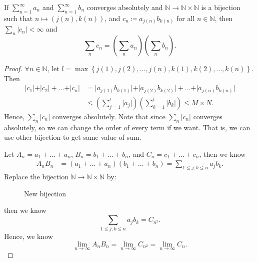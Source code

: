 \begin{theorem}
    If \(\sum_{n=1}^{\infty}  a_n \) and \(\sum_{n=1}^{\infty}  b_n \) converges absolutely and \(\mathbb{N} \to \mathbb{N} \times \mathbb{N} \) is a bijection such that \(n \mapsto \left( j(n), k(n) \right) \), and \(c_n \coloneqq a_{j(n)} b_{k(n)}\) for all \(n \in \mathbb{N} \), then \(\sum_{n} \vert c_n \vert < \infty \) and 
    \[
        \sum_{n} c_n = \left( \sum_{n} a_n  \right) \left( \sum_{n} b_n  \right).   
    \]      
\end{theorem}
\begin{proof}
    \(\forall n \in \mathbb{N} \), let \(l = \max \left\{ j(1), j(2), \dots , j(n), k(1), k(2), \dots , k(n)\right\} \). Then
    \begin{align*}
                \vert c_1 \vert + \vert c_2 \vert + \dots + \vert c_n \vert &= \vert a_{j(1)} b_{k(1)} \vert + \vert a_{j(2)} b_{k(2)} \vert + \dots + \vert a_{j(n)} b_{k(n)} \vert \\ &\le \left( \sum_{j=1}^l \vert a_j \vert   \right) \left( \sum_{k=1}^l \vert b_k \vert \right) \le M \times N. 
    \end{align*}
    Hence, \(\sum_{n} \vert c_n \vert\) converges absolutely. Note that since \(\sum_{n} \vert c_n \vert\) converges absolutely, so we can change the order of every term if we want. That is, we can use other bijection to get same value of sum.
    
    Let \(A_n = a_1 + \dots + a_n\), \(B_n = b_1 + \dots + b_n\), and \(C_n = c_1 + \dots + c_n\), then we know 
    \begin{align*}
        A_n B_n &= \left( a_1 + \dots + a_n \right) \left( b_1 + \dots + b_n \right) = \sum_{1 \le j,k \le n} a_j b_k.  
    \end{align*} 
    Replace the bijection \(\mathbb{N} \to \mathbb{N} \times \mathbb{N} \) by: 
\begin{figure}[H]
    \centering
    \caption{New bijection}
    \label{fig:bijcn}
\end{figure}
then we know 
\[
    \sum_{1 \le j,k \le n} a_j b_k = C_{n^2}. 
\]
Hence, we know 
\[
    \lim_{n \to \infty} A_n B_n = \lim_{n \to \infty} C_{n^2} = \lim_{n \to \infty} C_n.   
\]
\end{proof}



